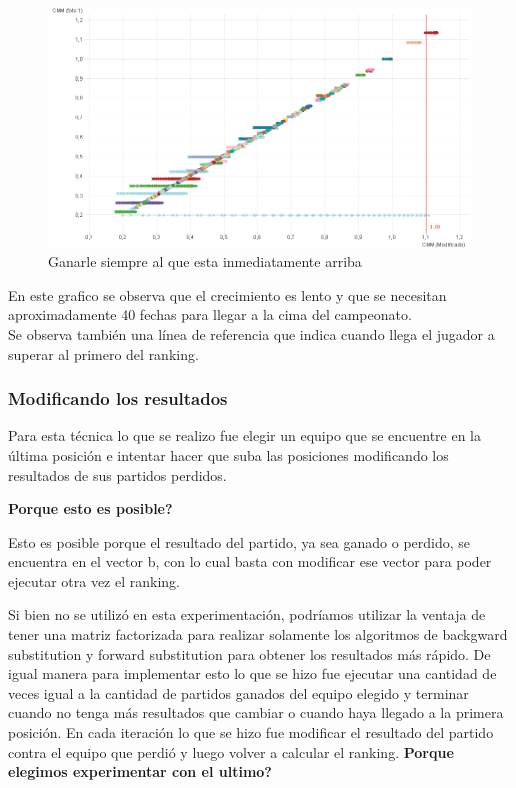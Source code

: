 \begin{figure}[H]
    \centering
    \includegraphics[width=1\textwidth]{IMG/estrategia 4.png}
    \caption{Ganarle siempre al que esta inmediatamente arriba}
    \label{fig:Ganarle siempre al que esta inmediatamente arriba}
\end{figure}

En este grafico se observa que el crecimiento es lento y que se necesitan aproximadamente 40 fechas para llegar a la cima del campeonato.\\

Se observa también una línea de referencia que indica cuando llega el jugador a superar al primero del ranking.\\

\subsubsection{Modificando los resultados}

Para esta técnica lo que se realizo fue elegir un equipo que se encuentre en la última posición e intentar hacer que suba las posiciones modificando los resultados de sus partidos perdidos.

\textbf{Porque esto es posible?}

Esto es posible porque el resultado del partido, ya sea ganado o perdido, se encuentra en el vector b, con lo cual basta con modificar ese vector para poder ejecutar otra vez el ranking.

Si bien no se utilizó en esta experimentación, podríamos utilizar la ventaja de tener una matriz factorizada para realizar solamente los algoritmos de backgward substitution y forward substitution para obtener los resultados más rápido.
De igual manera para implementar esto lo que se hizo fue ejecutar una cantidad de veces igual a la cantidad de partidos ganados del equipo elegido y terminar cuando no tenga más resultados que cambiar o cuando haya llegado a la primera posición. En cada iteración lo que se hizo fue modificar el resultado del partido contra el equipo que perdió y luego volver a calcular el ranking.
\newpage
\textbf{Porque elegimos experimentar con el ultimo?}

